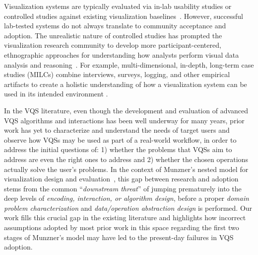   \par {}
  \npar Visualization systems are typically evaluated via in-lab usability studies or controlled studies against existing visualization baselines~\cite{Plaisant2004,North2006,Yi2008}. However, successful lab-tested systems do not always translate to community acceptance and adoption.  The unrealistic nature of controlled studies has prompted the visualization research community to develop more participant-centered, ethnographic approaches for understanding how analysts perform visual data analysis and reasoning~\cite{Plaisant2004,lam2012empirical,shneiderman2006strategies,munzner2009nested,Sedlmair2012}. For example, multi-dimensional, in-depth, long-term case studies (MILCs) combine interviews, surveys, logging, and other empirical artifacts to create a holistic understanding of how a visualization system can be used in its intended environment \cite{shneiderman2006strategies}. 
  \par In the VQS literature, even though the development and evaluation of advanced VQS algorithms and interactions has been well underway for many years, prior work has yet to characterize and understand the needs of target users and observe how VQSs may be used as part of a real-world workflow, in order to address the initial questions of: 1) whether the problems that VQSs aim to address are even the right ones to address and 2) whether the chosen operations actually solve the user's problems. In the context of Munzner's nested model for visualization design and evaluation~\cite{munzner2009nested}, this gap between research and adoption stems from the common ``\textit{downstream threat}'' of jumping prematurely into the deep levels of \textit{encoding, interaction, or algorithm design}, before a proper \textit{domain problem characterization} and \textit{data/operation abstraction design} is performed. Our work fills this crucial gap in the existing literature and highlights how incorrect assumptions adopted by most prior work in this space regarding the first two stages of Munzner's model may have led to the present-day failures in VQS adoption.
